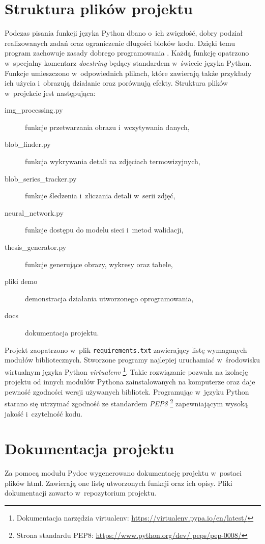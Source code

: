 \section{Struktura plików projektu}
Podczas pisania funkcji języka Python dbano o~ich zwięzłość, dobry podział
realizowanych zadań oraz ograniczenie długości bloków kodu.
Dzięki temu program zachowuje zasady dobrego programowania \cite{martin_code}.
Każdą funkcję opatrzono w~specjalny komentarz \emph{docstring} będący standardem
w~świecie języka Python.
Funkcje umieszczono w~odpowiednich plikach, które zawierają także przykłady ich
użycia i~obrazują działanie oraz porównują efekty.
Struktura plików w~projekcie jest następująca:
\begin{description}
    \item[img\_processing.py]
        funkcje przetwarzania obrazu i~wczytywania danych,
    \item[blob\_finder.py]
        funkcja wykrywania detali na zdjęciach termowizyjnych,
    \item[blob\_series\_tracker.py]
        funkcje śledzenia i~zliczania detali w~serii zdjęć,
    \item[neural\_network.py]
        funkcje dostępu do modelu sieci i~metod walidacji,
    \item[thesis\_generator.py]
        funkcje generujące obrazy, wykresy oraz tabele,
    \item[pliki demo]
        demonstracja działania utworzonego oprogramowania,
    \item[docs] dokumentacja projektu.
\end{description}

Projekt zaopatrzono w~plik \texttt{requirements.txt} zawierający listę
wymaganych modułów bibliotecznych.
Stworzone programy najlepiej uruchamiać w~środowisku wirtualnym języka Python
\emph{virtualenv}%
\footnote{%
    Dokumentacja narzędzia virtualenv:
    \url{https://virtualenv.pypa.io/en/latest/}}.
Takie rozwiązanie pozwala na izolację projektu od innych modułów Pythona
zainstalowanych na komputerze oraz daje pewność zgodności wersji używanych
bibliotek.
Programując w~języku Python starano się utrzymać zgodność ze standardem
\emph{PEP8}%
\footnote{%
    Strona standardu PEP8: \url{https://www.python.org/dev/ peps/pep-0008/}}
zapewniającym wysoką jakość i~czytelność kodu.

\section{Dokumentacja projektu}
Za pomocą modułu Pydoc wygenerowano dokumentację projektu w~postaci plików
html.
Zawierają one listę utworzonych funkcji oraz ich opisy.
Pliki dokumentacji zawarto w~repozytorium projektu.

